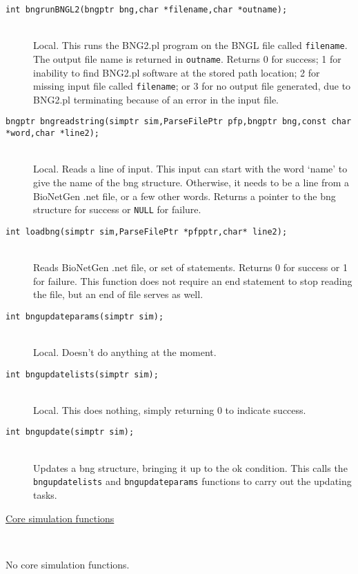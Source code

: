 \documentclass {book}
\newcommand {\ttt} {\texttt}
\begin{document}
\begin{description}
\item[\ttt{int bngrunBNGL2(bngptr bng,char *filename,char *outname);}]
\hfill \\
Local. This runs the BNG2.pl program on the BNGL file called \ttt{filename}. The output file name is returned in \ttt{outname}. Returns 0 for success; 1 for inability to find BNG2.pl software at the stored path location; 2 for missing input file called \ttt{filename}; or 3 for no output file generated, due to BNG2.pl terminating because of an error in the input file.

\item[\ttt{bngptr bngreadstring(simptr sim,ParseFilePtr pfp,bngptr bng,const char *word,char *line2);}]
\hfill \\
Local. Reads a line of input. This input can start with the word `name' to give the name of the bng structure. Otherwise, it needs to be a line from a BioNetGen .net file, or a few other words. Returns a pointer to the bng structure for success or \ttt{NULL} for failure.

\item[\ttt{int loadbng(simptr sim,ParseFilePtr *pfpptr,char* line2);}]
\hfill \\
Reads BioNetGen .net file, or set of statements. Returns 0 for success or 1 for failure. This function does not require an end statement to stop reading the file, but an end of file serves as well.

\item[\ttt{int bngupdateparams(simptr sim);}]
\hfill \\
Local. Doesn't do anything at the moment.

\item[\ttt{int bngupdatelists(simptr sim);}]
\hfill \\
Local. This does nothing, simply returning 0 to indicate success.

\item[\ttt{int bngupdate(simptr sim);}]
\hfill \\
Updates a bng structure, bringing it up to the ok condition. This calls the \ttt{bngupdatelists} and \ttt{bngupdateparams} functions to carry out the updating tasks.

\item[\underline{Core simulation functions}]
\hfill \\

\item[No core simulation functions.]

\end{description}
\end{document}
